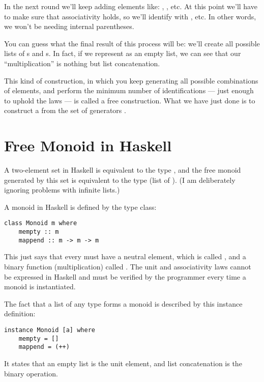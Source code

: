 \noindent
In the next round we'll keep adding elements like:
, , etc. At this point we'll
have to make sure that associativity holds, so we'll identify
 with , etc. In other words,
we won't be needing internal parentheses.

You can guess what the final result of this process will be: we'll
create all possible lists of s and s. In fact, if we
represent  as an empty list, we can see that our
``multiplication'' is nothing but list concatenation.

This kind of construction, in which you keep generating all possible
combinations of elements, and perform the minimum number of
identifications --- just enough to uphold the laws --- is called a free
construction. What we have just done is to construct a  from the set of generators .

\section{Free Monoid in Haskell}\label{free-monoid-in-haskell}

A two-element set in Haskell is equivalent to the type ,
and the free monoid generated by this set is equivalent to the type
\code{{[}Bool{]}} (list of ). (I am deliberately ignoring
problems with infinite lists.)

A monoid in Haskell is defined by the type class:

\begin{Verbatim}[commandchars=\\\{\}]
class Monoid m where
    mempty :: m
    mappend :: m -> m -> m
\end{Verbatim}
This just says that every  must have a neutral element,
which is called , and a binary function (multiplication)
called . The unit and associativity laws cannot be
expressed in Haskell and must be verified by the programmer every time a
monoid is instantiated.

The fact that a list of any type forms a monoid is described by this
instance definition:

\begin{Verbatim}[commandchars=\\\{\}]
instance Monoid [a] where
    mempty = []
    mappend = (++)
\end{Verbatim}
It states that an empty list \code{{[}{]}} is the unit element, and
list concatenation \code{(++)} is the binary operation.


